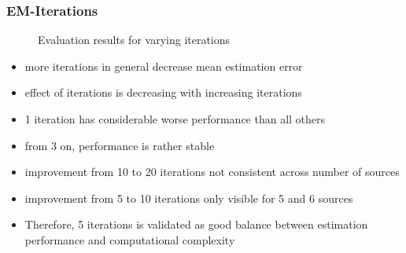 \clearpage
\subsubsection{EM-Iterations}

\begin{figure}[H]
	\begin{tikzpicture}
	    
	    
	\end{tikzpicture}
	\caption[Evaluation results for varying  iterations]{Evaluation results for varying  iterations}
	\label{fig:resultsEM}
\end{figure}

\begin{itemize}
\item more iterations in general decrease mean estimation error
\item effect of iterations is decreasing with increasing iterations
\item 1 iteration has considerable worse performance than all others
\item from 3 on, performance is rather stable
\item improvement from 10 to 20 iterations not consistent across number of sources 
\item improvement from 5 to 10 iterations only visible for 5 and 6 sources
\item Therefore, 5 iterations is validated as good balance between estimation performance and computational complexity
\end{itemize}



%    
